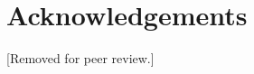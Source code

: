 \documentclass{scaffold/sigchi}
\begin{document}


\section{Acknowledgements}
[Removed for peer review.]


\balance{}




\end{document}
